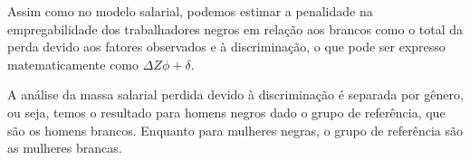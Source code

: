 \documentclass{article}
\begin{document}
	Assim como no modelo salarial, podemos estimar a penalidade na empregabilidade dos trabalhadores negros em relação aos brancos como o total da perda devido aos fatores observados e à discriminação, o que pode ser expresso matematicamente como $\Delta Z\phi + \delta$. \newline
	
	A análise da massa salarial perdida devido à discriminação é separada por gênero, ou seja, temos o resultado para homens negros dado o grupo de referência, que são os homens brancos. Enquanto para mulheres negras, o grupo de referência são as mulheres brancas. 
	
\end{document}
